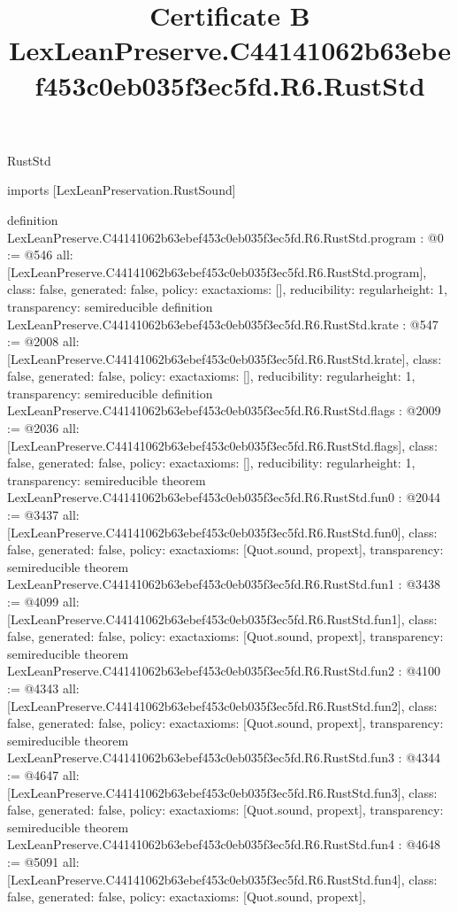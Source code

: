 \begin{lexlean}{RustStd}
\title{Certificate B LexLeanPreserve.C44141062b63ebef453c0eb035f3ec5fd.R6.RustStd}
\begin{coremodule}
imports [LexLeanPreservation.RustSound]

definition LexLeanPreserve.C44141062b63ebef453c0eb035f3ec5fd.R6.RustStd.program : @0 := @546 {
  all: [LexLeanPreserve.C44141062b63ebef453c0eb035f3ec5fd.R6.RustStd.program],
  class: false,
  generated: false,
  policy: exact{axioms: []},
  reducibility: regular{height: 1},
  transparency: semireducible
}
definition LexLeanPreserve.C44141062b63ebef453c0eb035f3ec5fd.R6.RustStd.krate : @547 := @2008 {
  all: [LexLeanPreserve.C44141062b63ebef453c0eb035f3ec5fd.R6.RustStd.krate],
  class: false,
  generated: false,
  policy: exact{axioms: []},
  reducibility: regular{height: 1},
  transparency: semireducible
}
definition LexLeanPreserve.C44141062b63ebef453c0eb035f3ec5fd.R6.RustStd.flags : @2009 := @2036 {
  all: [LexLeanPreserve.C44141062b63ebef453c0eb035f3ec5fd.R6.RustStd.flags],
  class: false,
  generated: false,
  policy: exact{axioms: []},
  reducibility: regular{height: 1},
  transparency: semireducible
}
theorem LexLeanPreserve.C44141062b63ebef453c0eb035f3ec5fd.R6.RustStd.fun0 : @2044 := @3437 {
  all: [LexLeanPreserve.C44141062b63ebef453c0eb035f3ec5fd.R6.RustStd.fun0],
  class: false,
  generated: false,
  policy: exact{axioms: [Quot.sound, propext]},
  transparency: semireducible
}
theorem LexLeanPreserve.C44141062b63ebef453c0eb035f3ec5fd.R6.RustStd.fun1 : @3438 := @4099 {
  all: [LexLeanPreserve.C44141062b63ebef453c0eb035f3ec5fd.R6.RustStd.fun1],
  class: false,
  generated: false,
  policy: exact{axioms: [Quot.sound, propext]},
  transparency: semireducible
}
theorem LexLeanPreserve.C44141062b63ebef453c0eb035f3ec5fd.R6.RustStd.fun2 : @4100 := @4343 {
  all: [LexLeanPreserve.C44141062b63ebef453c0eb035f3ec5fd.R6.RustStd.fun2],
  class: false,
  generated: false,
  policy: exact{axioms: [Quot.sound, propext]},
  transparency: semireducible
}
theorem LexLeanPreserve.C44141062b63ebef453c0eb035f3ec5fd.R6.RustStd.fun3 : @4344 := @4647 {
  all: [LexLeanPreserve.C44141062b63ebef453c0eb035f3ec5fd.R6.RustStd.fun3],
  class: false,
  generated: false,
  policy: exact{axioms: [Quot.sound, propext]},
  transparency: semireducible
}
theorem LexLeanPreserve.C44141062b63ebef453c0eb035f3ec5fd.R6.RustStd.fun4 : @4648 := @5091 {
  all: [LexLeanPreserve.C44141062b63ebef453c0eb035f3ec5fd.R6.RustStd.fun4],
  class: false,
  generated: false,
  policy: exact{axioms: [Quot.sound, propext]},
}
\end{coremodule}
\end{lexlean}
